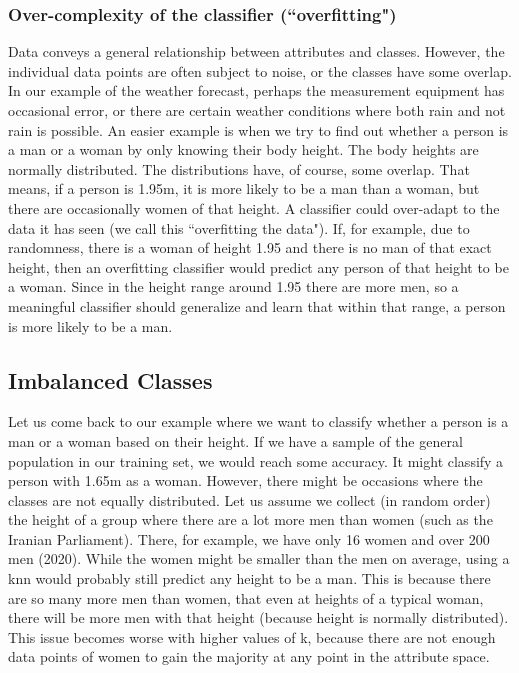 \documentclass[10pt,a4paper]{article}
\begin{document}
\subsubsection{Over-complexity of the classifier (``overfitting")}
Data conveys a general relationship between attributes and classes. However, the individual data points are often subject to noise, or the classes have some overlap. In our example of the weather forecast, perhaps the measurement equipment has occasional error, or there are certain weather conditions where both rain and not rain is possible. An easier example is when we try to find out whether a person is a man or a woman by only knowing their body height. The body heights are normally distributed. The distributions have, of course, some overlap. That means, if a person is 1.95m, it is more likely to be a man than a woman, but there are occasionally women of that height.  A classifier could over-adapt to the data it has seen (we call this ``overfitting the data"). If, for example, due to randomness, there is a woman of height 1.95 and there is no man of that exact height, then an overfitting classifier would predict any person of that height to be a woman. Since in the height range around 1.95 there are more men, so a meaningful classifier should generalize and learn that within that range, a person is more likely to be a man.

\subsection{Imbalanced Classes}
Let us come back to our example where we want to classify whether a person is a man or a woman based on their height. If we have a sample of the general population in our training set, we would reach some accuracy. It might classify a person with 1.65m as a woman. However, there might be occasions where the classes are not equally distributed. Let us assume we collect (in random order) the height of a group where there are a lot more men than women (such as the Iranian Parliament). There, for example, we have only 16 women and over 200 men (2020). While the women might be smaller than the men on average, using a knn would probably still predict any height to be a man. This is because there are so many more men than women, that even at heights of a typical woman, there will be more men with that height (because height is normally distributed). This issue becomes worse with higher values of k, because there are not enough data points of women to gain the majority at any point in the attribute space.
\end{document}
